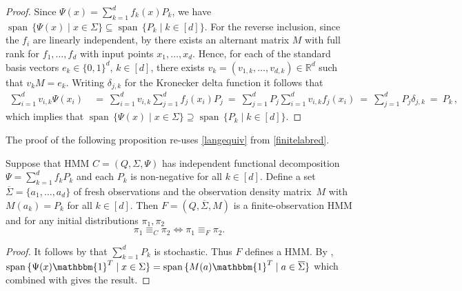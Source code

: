 \documentclass[a4paper,UKenglish,cleveref, autoref,mathscr]{lipics-v2019}
\newcommand{\RR}{\mathbb{R}}
\newcommand{\1}{\mathbbm{1}}
\DeclareMathOperator{\Span}{span\,}
\begin{document}
\begin{proof}
Since $\Psi(x) = \sum_{k = 1}^d f_k(x) P_k$, we have $\Span \{\Psi(x) \mid x \in \Sigma\} \subseteq \Span \{P_k \mid k \in [d]\}$. For the reverse inclusion, since the $f_i$ are linearly independent, by  there exists an alternant matrix $M$ with full rank for $f_1, \dots, f_d$ with input points $x_1, \dots, x_d$.
Hence, for each of the standard basis vectors $e_k \in \{0,1\}^d$, $k \in [d]$, there exists $v_k = (v_{1,k} ,\dots, v_{d,k}) \in \RR^d$ such that $v_k M = e_k$. Writing $\delta_{j,k}$ for the Kronecker delta function it follows that
\begin{equation*}
\begin{split}
\sum_{i = 1}^d v_{i,k} \Psi(x_i) & \ = \ \sum_{i = 1}^d v_{i,k} \sum_{j = 1}^d f_j(x_i) P_j
 \ = \ \sum_{j = 1}^d P_j \sum_{i = 1}^d v_{i,k} f_j(x_i)
 \ = \ \sum_{j = 1}^d P_j \delta_{j,k}
 \ = \ P_k\,,
\end{split}
\end{equation*}
which implies that $\Span \{\Psi(x) \mid x \in \Sigma\} \supseteq \Span \{P_k \mid k \in [d]\}.$
\end{proof}

The proof of the following proposition re-uses \cref{langequiv} from \cref{finitelabred}.
\begin{proposition}\label{nonnegreduction}
Suppose that HMM $C = (Q, \Sigma, \Psi)$ has independent functional decomposition $\Psi = \sum_{k = 1}^d f_k P_k$ and each  $P_k$ is non-negative for all $k \in [d]$. Define a set $\overline{\Sigma} = \{ a_1, \dots, a_d \}$ of fresh observations and the observation density matrix~$M$ with
$M(a_k) = P_k$ for all $k \in [d]$. Then $F = (Q, \overline{\Sigma}, M)$ is a finite-observation HMM and for any initial distributions $\pi_1, \pi_2$
\[\pi_1 \equiv_C \pi_2 \iff \pi_1 \equiv_F \pi_2. \]
\end{proposition}

\begin{proof}
It follows by  that $\sum_{k = 1}^d P_k$ is stochastic. Thus $F$ defines a HMM. By ,  $\Span \{\Psi(x)\1^T \mid x \in \Sigma\} = \Span \{M(a)\1^T \mid a \in \overline{\Sigma}\}$ which combined with  gives the result.
\end{proof}
\end{document}
